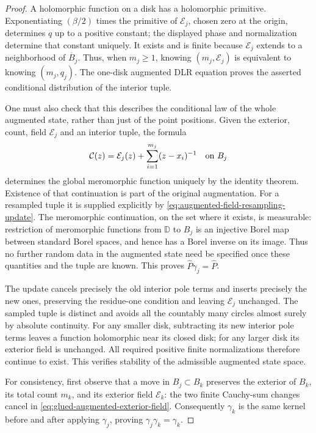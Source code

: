 \documentclass[11pt,a4paper]{article}
\numberwithin{equation}{section}
\theoremstyle{definition}
\theoremstyle{remark}
\newcommand{\D}{\mathbb D}
\begin{document}
\begin{proof}
A holomorphic function on a disk has a holomorphic primitive.
Exponentiating $(\beta/2)$ times the primitive of $\mathcal E_j$,
chosen zero at the origin, determines $q$ up to a positive constant;
the displayed phase and normalization determine that constant uniquely.
It exists and is finite because $\mathcal E_j$ extends to a
neighborhood of $\overline B_j$. Thus, when $m_j\ge1$, knowing
$(m_j,\mathcal E_j)$ is equivalent to knowing $(m_j,q_j)$. The one-disk
augmented DLR equation proves the asserted conditional distribution
of the interior tuple.

One must also check that this describes the conditional law of the
whole augmented state, rather than just of the point positions. Given
the exterior, count, field $\mathcal E_j$ and an interior tuple, the
formula
\[
 \mathcal C(z)=\mathcal E_j(z)+\sum_{i=1}^{m_j}(z-x_i)^{-1}
                    \quad\hbox{on }B_j
\]
determines the global meromorphic function uniquely by the identity
theorem. Existence of that continuation is part of the original
augmentation. For a resampled tuple it is supplied explicitly by
\eqref{eq:augmented-field-resampling-update}. The meromorphic
continuation, on the set where it exists, is measurable: restriction
of meromorphic functions from $\D$ to $B_j$ is an injective Borel map
between standard Borel spaces, and hence has a Borel inverse on its
image. Thus no further random data in the augmented state need be
specified once these quantities and the tuple are known. This proves
$\widehat P\gamma_j=\widehat P$.

The update cancels precisely the old interior pole terms and inserts
precisely the new ones, preserving the residue-one condition and
leaving $\mathcal E_j$ unchanged. The sampled tuple is distinct and
avoids all the countably many circles almost surely by absolute
continuity. For any smaller disk, subtracting its new interior pole
terms leaves a function holomorphic near its closed disk; for any
larger disk its exterior field is unchanged. All required positive
finite normalizations therefore continue to exist. This verifies
stability of the admissible augmented state space.

For consistency, first observe that a move in $B_j\subset B_k$
preserves the exterior of $B_k$, its total count $m_k$, and its exterior
field $\mathcal E_k$: the two finite Cauchy-sum changes cancel in
\eqref{eq:glued-augmented-exterior-field}. Consequently $\gamma_k$ is the
same kernel before and after applying $\gamma_j$, proving
$\gamma_j\gamma_k=\gamma_k$.


\end{proof}
\end{document}

